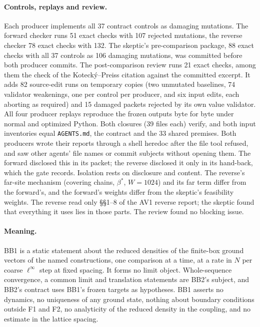 \paragraph{Controls, replays and review.} Each producer implements all 37
contract controls as damaging mutations. The forward checker runs 51 exact
checks with 107 rejected mutations, the reverse checker 78 exact checks with
132. The skeptic's pre-comparison package, 88 exact checks with all 37
controls as 106 damaging mutations, was committed before both producer
commits. The post-comparison review runs 21 exact checks, among them the
check of the Kotecký--Preiss citation against the committed excerpt. It adds
82 source-edit runs on temporary copies (two unmutated baselines, 74
validator weakenings, one per control per producer, and six input edits,
each aborting as required) and 15 damaged packets rejected by its own value
validator. All four producer replays reproduce the frozen outputs byte for
byte under normal and optimized Python. Both closures (39 files each) verify,
and both input inventories equal \texttt{AGENTS.md}, the contract and the 33
shared premises. Both producers wrote their reports through a shell heredoc
after the file tool refused, and saw other agents' file names or commit
subjects without opening them. The forward disclosed this in its packet; the
reverse disclosed it only in its hand-back, which the gate records.
Isolation rests on disclosure and content. The reverse's far-site mechanism
(covering chains, $\beta^*$, $W=1024$) and its far term differ from the
forward's, and the forward's weights differ from the skeptic's feasibility
weights. The reverse read only \S\S1--8 of the AV1 reverse report; the
skeptic found that everything it uses lies in those parts. The review found
no blocking issue.

\paragraph{Meaning.} BB1 is a static statement about the reduced densities of
the finite-box ground vectors of the named constructions, one comparison at a
time, at a rate in $N$ per coarse $\ell^\infty$ step at fixed spacing. It
forms no limit object. Whole-sequence convergence, a common limit and
translation statements are BB2's subject, and BB2's contract uses BB1's
frozen targets as hypotheses. BB1 asserts no dynamics, no uniqueness of any
ground state, nothing about boundary conditions outside F1 and F2, no
analyticity of the reduced density in the coupling, and no estimate in the
lattice spacing.

